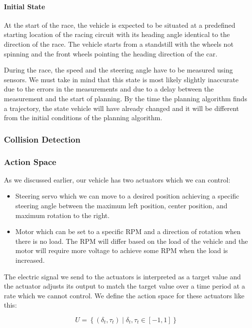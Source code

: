 \paragraph{Initial State}
At the start of the race, the vehicle is expected to be situated at a predefined starting location of the racing circuit with its heading angle identical to the direction of the race. The vehicle starts from a standstill with the wheels not spinning and the front wheels pointing the heading direction of the car.

During the race, the speed and the steering angle have to be measured using sensors. We must take in mind that this state is most likely slightly inaccurate due to the errors in the measurements and due to a delay between the measurement and the start of planning. By the time the planning algorithm finds a trajectory, the state vehicle will have already changed and it will be different from the initial conditions of the planning algorithm.

\subsubsection{Collision Detection}

\subsubsection{Action Space}

As we discussed earlier, our vehicle has two actuators which we can control:
\begin{itemize}
	\item Steering servo which we can move to a desired position achieving a specific steering angle between the maximum left position, center position, and maximum rotation to the right.
	
	\item Motor which can be set to a specific \gls{RPM} and a direction of rotation when there is no load. The \gls*{RPM} will differ based on the load of the vehicle and the motor will require more voltage to achieve some RPM when the load is increased.
\end{itemize}

The electric signal we send to the actuators is interpreted as a target value and the actuator adjusts its output to match the target value over a time period at a rate which we cannot control. We define the action space for these actuators like this:

\[
U=\left\{ \left( \delta_t,\tau_t\right) \mid \delta_t,\tau_t\in\left[-1, 1\right] \right\}
\]

